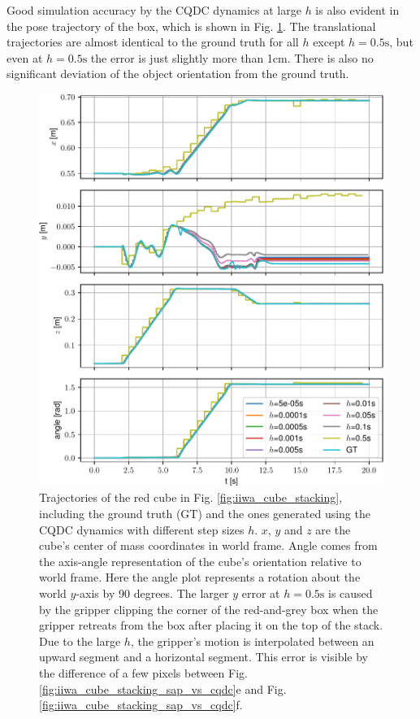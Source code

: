 Good simulation accuracy by the CQDC dynamics at large $h$ is also evident in the pose trajectory of the box, which is shown in Fig. \ref{fig:cube_pose}. The translational trajectories are almost identical to the ground truth for all $h$ except $h=0.5\mathrm{s}$, but even at $h=0.5\mathrm{s}$ the error is just slightly more than 1cm. There is also no significant deviation of the object orientation from the ground truth. 
\begin{figure}
\centering
\includegraphics[width=0.9\linewidth]{figures/02_quasi_static_dynamics/box0_pose.pdf}
\caption{Trajectories of the red cube in Fig. \ref{fig:iiwa_cube_stacking}, including the ground truth (GT) and the ones generated using the CQDC dynamics with different step sizes $h$. $x$, $y$ and $z$ are the cube's center of mass coordinates in world frame. Angle comes from the axis-angle representation of the cube's orientation relative to world frame. Here the angle plot represents a rotation about the world $y$-axis by 90 degrees. The larger $y$ error at $h=0.5\mathrm{s}$ is caused by the gripper clipping the corner of the red-and-grey box when the gripper retreats from the box after placing it on the top of the stack. Due to the large $h$, the gripper's motion is interpolated between an upward segment and a horizontal segment. This error is visible by the difference of a few pixels between Fig. \ref{fig:iiwa_cube_stacking_sap_vs_cqdc}e
and Fig. \ref{fig:iiwa_cube_stacking_sap_vs_cqdc}f.
}
\label{fig:cube_pose}
\end{figure}

